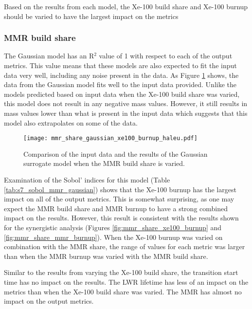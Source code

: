 Based on the results from each model, the Xe-100 build share and Xe-100 burnup 
should be varied to have the largest impact on the metrics

\subsubsection{MMR build share}
The Gaussian model has an R$^2$ value of 1 with respect to each of the output 
metrics. This value means that these models are also expected to fit the input 
data very well, including any noise present in the data. As Figure 
\ref{fig:s7_mmr_gaussian} shows, the data from the Gaussian model fits well 
to the input data provided. Unlike the models predicted based on input data when 
the Xe-100 build share was varied, this model does not result in any negative 
mass values. However, it still results in mass values lower than what is 
present in the input data which suggests that this model also extrapolates 
on some of the data. 

\begin{figure}
    \centering 
    \texttt{[image: mmr\_share\_gaussian\_xe100\_burnup\_haleu.pdf]}
    \caption{Comparison of the input data and the results of the Gaussian 
    surrogate model when the MMR build share is varied.}
    \label{fig:s7_mmr_gaussian}
\end{figure}

Examination of the Sobol' indices for this model (Table \ref{tab:s7_sobol_mmr_gaussian})
shows that the Xe-100 burnup has the largest impact on all of the 
output metrics. This is somewhat surprising, as one may expect the \gls{MMR} 
build share and \gls{MMR} burnup to have a strong combined impact on 
the results. However, this result is consistent with the results 
shown for the synergistic analysis (Figures \ref{fig:mmr_share_xe100_burnup} and 
\ref{fig:mmr_share_mmr_burnup}). When the Xe-100 burnup was varied on combination 
with the \gls{MMR} share, the range of values for each metric was larger than 
when the \gls{MMR} burnup was varied with the \gls{MMR} build share. 

Similar to the results from varying the Xe-100  build share, the 
transition start time has no impact on the results. The \gls{LWR} 
lifetime has less of an impact on the metrics than when the Xe-100 
build share was varied. The \gls{MMR} has almost no impact on the 
output metrics. 

